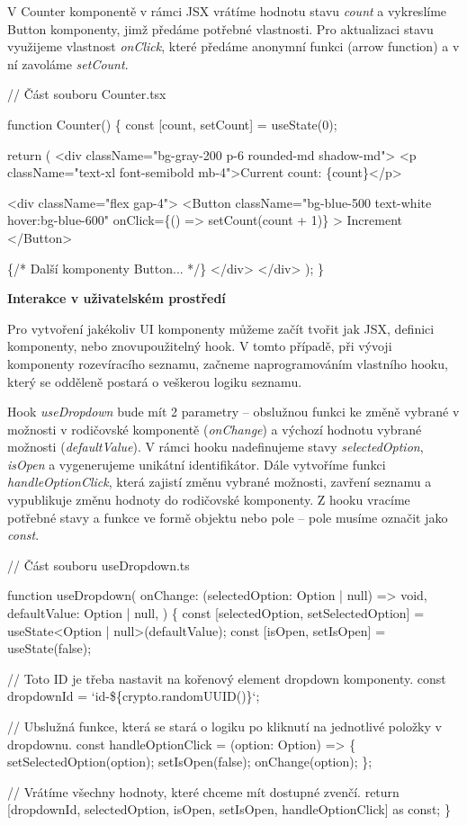 V Counter komponentě v rámci JSX vrátíme hodnotu stavu \emph{count} a vykreslíme Button komponenty, jimž předáme potřebné vlastnosti. 
Pro aktualizaci stavu využijeme vlastnost \emph{onClick}, které předáme anonymní funkci (arrow function) a v ní zavoláme \emph{setCount}.

\begin{prog}
// Část souboru Counter.tsx

function Counter() \{
  const [count, setCount] = useState(0);

  return (
    <div className="bg-gray-200 p-6 rounded-md shadow-md">
      <p className="text-xl font-semibold mb-4">Current count: \{count\}</p>

      <div className="flex gap-4">
        <Button
          className="bg-blue-500 text-white hover:bg-blue-600"
          onClick=\{() => setCount(count + 1)\}
        >
          Increment
        </Button>

        \{/* Další komponenty Button... */\}
      </div>
    </div>
  );
\}
\end{prog}

\begin{flushleft}
  \textbf{Interakce v uživatelském prostředí}
\end{flushleft}

Pro vytvoření jakékoliv UI komponenty můžeme začít tvořit jak JSX, definici komponenty, nebo znovupoužitelný hook. 
V tomto případě, při vývoji komponenty rozevíracího seznamu, začneme naprogramováním vlastního hooku, který se odděleně postará o veškerou logiku seznamu.

Hook \emph{useDropdown} bude mít 2 parametry -- obslužnou funkci ke změně vybrané v možnosti v rodičovské komponentě (\emph{onChange}) a výchozí hodnotu vybrané možnosti (\emph{defaultValue}). 
V rámci hooku nadefinujeme stavy \emph{selectedOption}, \emph{isOpen} a vygenerujeme unikátní identifikátor. 
Dále vytvoříme funkci \emph{handleOptionClick}, která zajistí změnu vybrané možnosti, zavření seznamu a vypublikuje změnu hodnoty do rodičovské komponenty. 
Z hooku vracíme potřebné stavy a funkce ve formě objektu nebo pole -- pole musíme označit jako \emph{const}.

\begin{prog}
// Část souboru useDropdown.ts

function useDropdown(
  onChange: (selectedOption: Option | null) => void,
  defaultValue: Option | null,
) \{
  const [selectedOption, setSelectedOption] 
    = useState<Option | null>(defaultValue);
  const [isOpen, setIsOpen] = useState(false);

  // Toto ID je třeba nastavit na kořenový element dropdown komponenty.
  const dropdownId = `id-\$\{crypto.randomUUID()\}`;

  // Ubslužná funkce, která se stará o logiku
    po kliknutí na jednotlivé položky v dropdownu.
  const handleOptionClick = (option: Option) => \{
    setSelectedOption(option);
    setIsOpen(false);
    onChange(option);
  \};

  // Vrátíme všechny hodnoty, které chceme mít dostupné zvenčí.
  return [dropdownId, selectedOption, 
    isOpen, setIsOpen, handleOptionClick] as const;
\}
\end{prog}

